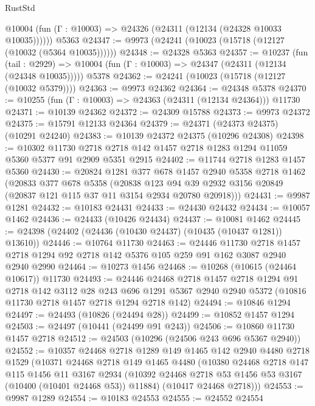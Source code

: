 \begin{lexlean}{RustStd}
\begin{coremodule}
      @10004 (fun (Γ : @10003) => @24326 (@24311 (@12134 (@24328 @10033 @10035))))))
    @5363
@24347 := @9973 (@24241 (@10023 (@15718 (@12127 (@10032 (@5364 @10035))))))
@24348 := @24328 @5363
@24357 := @10237
    (fun (tail : @2929) => @10004 (fun (Γ : @10003) => @24347 (@24311 (@12134 (@24348 @10035)))))
    @5378
@24362 := @24241 (@10023 (@15718 (@12127 (@10032 @5379))))
@24363 := @9973 @24362
@24364 := @24348 @5378
@24370 := @10255 (fun (Γ : @10003) => @24363 (@24311 (@12134 @24364))) @11730
@24371 := @10139 @24362
@24372 := @24309 @15788
@24373 := @9973 @24372
@24375 := @15791 @12133 @24364
@24379 := @24371 (@24373 @24375) (@10291 @24240)
@24383 := @10139 @24372 @24375 (@10296 @24308)
@24398 := @10302
    @11730
    @2718
    @2718
    @142
    @1457
    @2718
    @1283
    @1294
    @11059
    @5360
    @5377
    @91
    @2909
    @5351
    @2915
@24402 := @11744 @2718 @1283 @1457 @5360
@24430 := @20824
    @1281
    @377
    @678
    @1457
    @2940
    @5358
    @2718
    @1462
    (@20833
      @377
      @678
      @5358
      (@20838 @123 @94 @39 @2932 @3156 @20849 (@20837 @121 @115 @37 @11 @3154 @2934 @20780 @20918)))
@24431 := @9987 @1281
@24432 := @10183 @24431
@24433 := @24430 @24432
@24434 := @10057 @1462
@24436 := @24433 (@10426 @24434)
@24437 := @10081 @1462
@24445 := @24398 (@24402 (@24436 (@10430 @24437) (@10435 (@10437 @1281)) @13610))
@24446 := @10764 @11730
@24463 := @24446
    @11730
    @2718
    @1457
    @2718
    @1294
    @92
    @2718
    @142
    @5376
    @105
    @259
    @91
    @162
    @3087
    @2940
    @2940
    @2990
@24464 := @10273 @1456
@24468 := @10268 (@10615 (@24464 @10617)) @11730
@24493 := @24446
    @24468
    @2718
    @1457
    @2718
    @1294
    @91
    @2718
    @142
    @3112
    @28
    @243
    @696
    @1291
    @5367
    @2940
    @2940
    @5372
    (@10816 @11730 @2718 @1457 @2718 @1294 @2718 @142)
@24494 := @10846 @1294
@24497 := @24493 (@10826 (@24494 @28))
@24499 := @10852 @1457 @1294
@24503 := @24497 (@10441 (@24499 @91 @243))
@24506 := @10860 @11730 @1457 @2718
@24512 := @24503 (@10296 (@24506 @243 @696 @5367 @2940))
@24552 := @10357
    @24468
    @2718
    @1289
    @149
    @1465
    @142
    @2940
    @4480
    @2718
    @1529
    (@10371
      @24468
      @2718
      @149
      @1465
      @4480
      (@10380
        @24468
        @2718
        @147
        @115
        @1456
        @11
        @3167
        @2934
        (@10392 @24468 @2718 @53 @1456 @53 @3167 (@10400 (@10401 @24468 @53)) @11884)
        (@10417 @24468 @2718)))
@24553 := @9987 @1289
@24554 := @10183 @24553
@24555 := @24552 @24554

\end{coremodule}
\end{lexlean}
